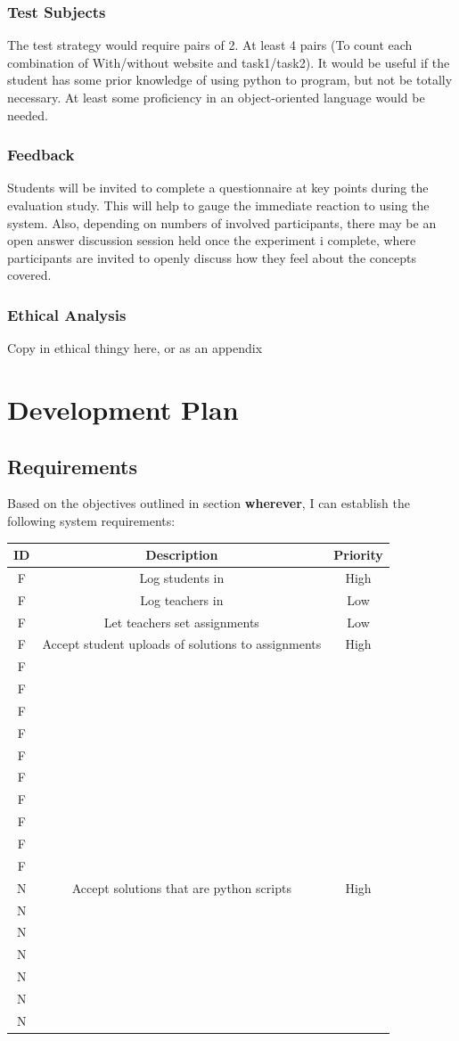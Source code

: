 \documentclass[a4paper,11pt]{report}
\newcounter{FunCount}
\newcounter{NFunCount}
\newcommand{\freq}[2]{\addtocounter{FunCount}{1}F\arabic{FunCount} & #1 & #2\\}
\newcommand{\nfreq}[2]{\addtocounter{NFunCount}{1}N\arabic{NFunCount} & #1 & #2\\}
\begin{document}
\subsection{Test Subjects}
The test strategy would require pairs of 2. At least 4 pairs (To count each combination of With/without website and task1/task2). It would be useful if the student has some prior knowledge of using python to program, but not be totally necessary. At least some proficiency in an object-oriented language would be needed.

\subsection{Feedback}
Students will be invited to complete a questionnaire at key points during the evaluation study. This will help to gauge the immediate reaction to using the system. Also, depending on numbers of involved participants, there may be an open answer discussion session held once the experiment i complete, where participants are invited to openly discuss how they feel about the concepts covered.

\subsection{Ethical Analysis}
Copy in ethical thingy here, or as an appendix

\chapter{Development Plan}

\section{Requirements}
Based on the objectives outlined in section \textbf{wherever}, I can establish the following system requirements:\par
\begin{longtable}{ccc}
\textbf{ID} & \textbf{Description} & \textbf{Priority}\\\hline
\freq{Log students in}{High}
\freq{Log teachers in}{Low}
\freq{Let teachers set assignments}{Low} %
\freq{Accept student uploads of solutions to assignments}{High}
\freq{}{}
\freq{}{}
\freq{}{}
\freq{}{}
\freq{}{}
\freq{}{}
\freq{}{}
\freq{}{}
\freq{}{}
\freq{}{}
\nfreq{Accept solutions that are python scripts}{High}
\nfreq{}{}
\nfreq{}{}
\nfreq{}{}
\nfreq{}{}
\nfreq{}{}
\nfreq{}{}
\end{longtable}
\end{document}
